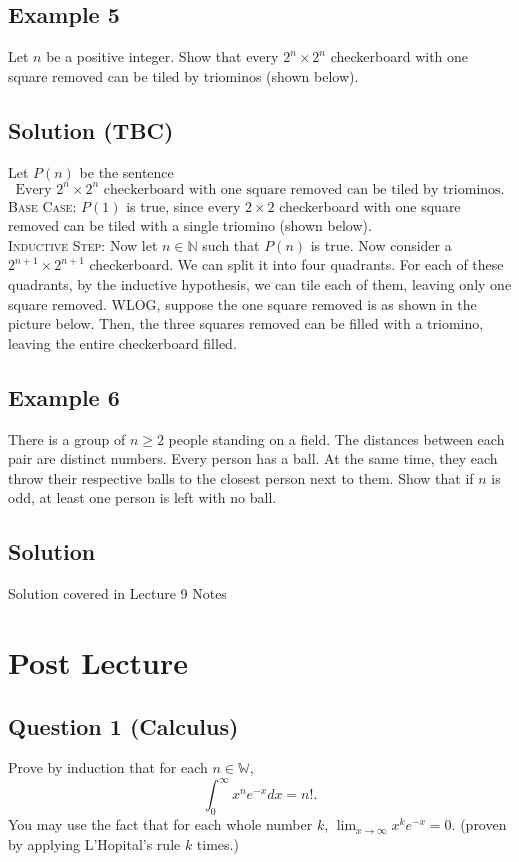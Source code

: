 \documentclass{article}
\begin{document}
\subsection*{Example 5}
    Let $n$ be a positive integer. Show that every $2^{n} \times 2^{n}$ checkerboard with one square removed can be tiled by triominos (shown below).
    
\subsection*{Solution (TBC)}
     Let $P(n)$ be the sentence $$\text{Every $2^{n} \times 2^{n}$ checkerboard with one square removed can be tiled by triominos}.$$
    \textsc{Base Case}: $P(1)$ is true, since every $2 \times 2$ checkerboard with one square removed can be tiled with a single triomino (shown below). \\
    \textsc{Inductive Step}: Now let $n \in \mathbb{N}$ such that $P(n)$ is true. Now consider a $2^{n + 1} \times 2^{n + 1}$ checkerboard. We can split it into four quadrants. For each of these quadrants, by the inductive hypothesis, we can tile each of them, leaving only one square removed. WLOG, suppose the one square removed is as shown in the picture below. Then, the three squares removed can be filled with a triomino, leaving the entire checkerboard filled.

\subsection*{Example 6}
    There is a group of $n \ge 2$ people standing on a field. The distances between each pair are distinct numbers. Every person has a ball. At the same time, they each throw their respective balls to the closest person next to them. Show that if $n$ is odd, at least one person is left with no ball.

\subsection*{Solution}
Solution covered in Lecture 9 Notes


\section*{Post Lecture}

\subsection*{Question 1 (Calculus)}
    Prove by induction that for each $n \in \mathbb{W}$, $$\int_0^\infty x^ne^{-x}dx = n!.$$ You may use the fact that for each whole number $k$, $\lim_{x \to \infty} x^ke^{-x} = 0$. (proven by applying L'Hopital's rule $k$ times.)
\end{document}

